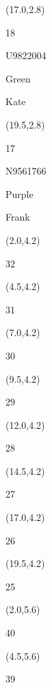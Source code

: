 \documentclass[a4paper]{article}
\newcommand{\myseat}[5]{%
\vspace{-0.1cm} \hspace{-0.5cm}
\parbox[t][2.2cm][t]{3.5cm}{%
\small #1 %
\begin{description}
\vspace{-0.1cm}
\item [ID:] #2
\vspace{-0.1cm}
\item [Team:] #3 \normalsize
\vspace{-0.1cm}
\item \normalsize #4 #5
\vspace{-0.1cm}
\end{description}
}
}
\begin{document}
\begin{CJK}{UTF8}{cyberbit}
\begin{textblock}{2.5}(17.0,2.8)
\myseat{18}{U9822004}{Green}{Kate}{}
\end{textblock}

\begin{textblock}{2.5}(19.5,2.8)
\myseat{17}{N9561766}{Purple}{Frank}{}
\end{textblock}


\begin{textblock}{2.5}(2.0,4.2)
\textblockcolor{}
\myseat{32}{}{}{}{}
\end{textblock}

\begin{textblock}{2.5}(4.5,4.2)
\textblockcolor{}
\myseat{31}{}{}{}{}
\end{textblock}

\begin{textblock}{2.5}(7.0,4.2)
\textblockcolor{}
\myseat{30}{}{}{}{}
\end{textblock}

\begin{textblock}{2.5}(9.5,4.2)
\textblockcolor{}
\myseat{29}{}{}{}{}
\end{textblock}

\begin{textblock}{2.5}(12.0,4.2)
\textblockcolor{}
\myseat{28}{}{}{}{}
\end{textblock}

\begin{textblock}{2.5}(14.5,4.2)
\textblockcolor{}
\myseat{27}{}{}{}{}
\end{textblock}

\begin{textblock}{2.5}(17.0,4.2)
\textblockcolor{}
\myseat{26}{}{}{}{}
\end{textblock}

\begin{textblock}{2.5}(19.5,4.2)
\textblockcolor{}
\myseat{25}{}{}{}{}
\end{textblock}


\begin{textblock}{2.5}(2.0,5.6)
\textblockcolor{}
\myseat{40}{}{}{}{}
\end{textblock}

\begin{textblock}{2.5}(4.5,5.6)
\textblockcolor{}
\myseat{39}{}{}{}{}
\end{textblock}


\end{CJK}
\end{document}
